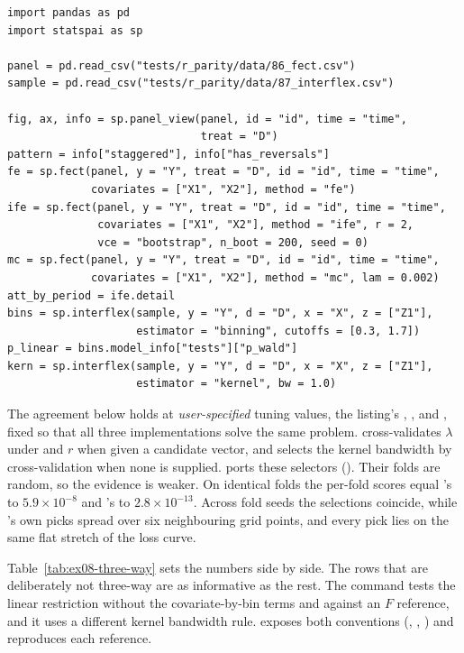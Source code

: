 \begin{lstlisting}[caption={Panel counterfactuals and interaction
effects. \code{pattern} is \code{(True, False)}, a staggered design without
reversals; \code{att\_by\_period} holds the ATT by relative period, and
\code{p\_linear} is the Wald $p$~value of the linear model against the
binning model.},label={lst:fect},captionpos=b]
import pandas as pd
import statspai as sp

panel = pd.read_csv("tests/r_parity/data/86_fect.csv")
sample = pd.read_csv("tests/r_parity/data/87_interflex.csv")

fig, ax, info = sp.panel_view(panel, id = "id", time = "time",
                              treat = "D")
pattern = info["staggered"], info["has_reversals"]
fe = sp.fect(panel, y = "Y", treat = "D", id = "id", time = "time",
             covariates = ["X1", "X2"], method = "fe")
ife = sp.fect(panel, y = "Y", treat = "D", id = "id", time = "time",
              covariates = ["X1", "X2"], method = "ife", r = 2,
              vce = "bootstrap", n_boot = 200, seed = 0)
mc = sp.fect(panel, y = "Y", treat = "D", id = "id", time = "time",
             covariates = ["X1", "X2"], method = "mc", lam = 0.002)
att_by_period = ife.detail
bins = sp.interflex(sample, y = "Y", d = "D", x = "X", z = ["Z1"],
                    estimator = "binning", cutoffs = [0.3, 1.7])
p_linear = bins.model_info["tests"]["p_wald"]
kern = sp.interflex(sample, y = "Y", d = "D", x = "X", z = ["Z1"],
                    estimator = "kernel", bw = 1.0)
\end{lstlisting}

The agreement below holds at \emph{user-specified} tuning values, the
listing's , , and , fixed so
that all three implementations solve the same problem. 
cross-validates \(\lambda\) under  and \(r\) when given a
candidate vector, and  selects the kernel bandwidth by
cross-validation when none is supplied. \statspai{} ports these selectors
(). Their folds are random, so the evidence is weaker. On
identical folds the per-fold scores equal 's to
\(5.9\times10^{-8}\) and 's to \(2.8\times10^{-13}\). Across
fold seeds the  selections coincide, while 's own
 picks spread over six neighbouring grid points, and every
\statspai{} pick lies on the same flat stretch of the loss curve.

Table~\ref{tab:ex08-three-way} sets the numbers side by side. The rows
that are deliberately not three-way are as informative as the rest. The
  command tests the linear restriction
without the covariate-by-bin terms and against an \(F\) reference, and it
uses a different kernel bandwidth rule.  exposes both
conventions (, ,
) and reproduces each reference.


